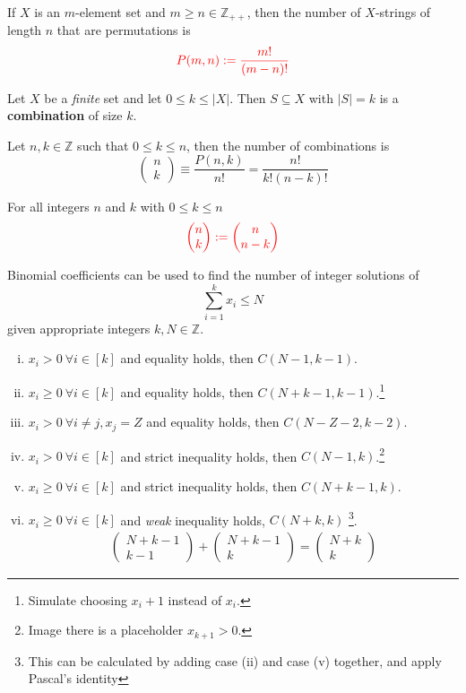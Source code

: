 \documentclass{article}
\def\Z{{\mathbb Z}}
\newcommand{\bi}[2]{\begin{pmatrix}{#1}\\{#2}\end{pmatrix}}
\begin{document}
			\begin{proposition}
				If $X$ is an $m$-element set and $m \geq n \in \Z_{++}$, then the number of $X$-strings of length $n$ that are permutations is 
				\begin{equation}
					\textcolor{red}{P(m, n) := \frac{m!}{(m-n)!}}
				\end{equation}
			\end{proposition}
			
			\begin{definition}
				Let $X$ be a \emph{finite} set and let $0 \leq k \leq |X|$. Then $S \subseteq X$ with $|S| = k$ is a \textbf{combination} of size $k$.
			\end{definition}
			
			\begin{proposition}
				Let $n, k \in \Z$ such that $0 \leq k \leq n$, then the number of combinations is
				\begin{equation}
					\bi{n}{k} \equiv \frac{P(n, k)}{n!} = \frac{n!}{k!(n-k)!}
				\end{equation}
			\end{proposition}
			
			\begin{proposition}
				For all integers $n$ and $k$ with $0 \leq k \leq n$
				\begin{equation}
					\red{\bi{n}{k} := \bi{n}{n-k}}
				\end{equation}
			\end{proposition}
			
			\begin{example}
				Binomial coefficients can be used to find the number of integer solutions of
				\begin{equation}
					\sum_{i=1}^k x_i \leq N
				\end{equation}
				given appropriate integers $k, N \in \Z$.
				\begin{enumerate}[(i)]
					\item $x_i > 0\ \forall i \in [k]$ and equality holds, then $C(N-1, k-1)$.
					\item $x_i \geq 0\ \forall i \in [k]$ and equality holds, then $C(N+k-1, k-1)$.\footnote{Simulate choosing $x_i + 1$ instead of $x_i$.}
					\item $x_i > 0\ \forall i \neq j, x_j = Z$ and equality holds, then $C(N-Z-2,k-2)$.
					\item $x_i > 0\ \forall i \in [k]$ and strict inequality holds, then $C(N-1, k)$.\footnote{Image there is a placeholder $x_{k+1} > 0$.}
					\item $x_i \geq 0\ \forall i \in [k]$ and strict inequality holds, then $C(N+k-1, k)$.
					\item $x_i \geq 0\ \forall i \in [k]$ and \emph{weak} inequality holds, $C(N+k, k)$ \footnote{This can be calculated by adding case (ii) and case (v) together, and apply Pascal's identity}.
					\begin{gather}
						\bi{N+k-1}{k-1} + \bi{N+k-1}{k} = \bi{N+k}{k}
					\end{gather}
				\end{enumerate}
			\end{example}
			
\end{document}
